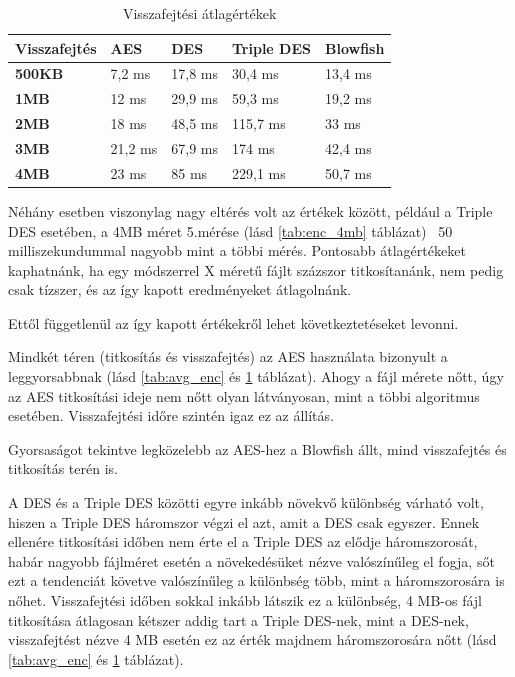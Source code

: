 \begin{table}[H]
	\centering
	\caption{Visszafejtési átlagértékek}
	\label{tab:avg_dec}
	\medskip	
	\begin{tabular}{|p{2.4cm}|p{2.7cm}|p{2.7cm}|p{2.7cm}|p{2.7cm}|}
		\hline
		\textbf{Visszafejtés}& \textbf{AES} & \textbf{DES} & \textbf{Triple DES}  & \textbf{Blowfish} \\
		\hline
		\textbf{500KB}&7,2 ms&17,8 ms&30,4 ms&13,4 ms \\
		\hline
		\textbf{1MB}&12 ms&29,9 ms&59,3 ms&19,2 ms \\
		\hline
		\textbf{2MB}&18 ms&48,5 ms&115,7 ms&33 ms \\
		\hline
		\textbf{3MB}&21,2 ms&67,9 ms&174 ms&42,4 ms \\
		\hline
		\textbf{4MB}&23 ms&85 ms&229,1 ms&50,7 ms \\
		\hline
	\end{tabular}
\end{table}


\noindent Néhány esetben viszonylag nagy eltérés volt az értékek között, például a Triple DES esetében, a 4MB méret 5.mérése (lásd \ref{tab:enc_4mb} táblázat) ~50 milliszekundummal nagyobb mint a többi mérés. Pontosabb átlagértékeket kaphatnánk, ha egy módszerrel X méretű fájlt százszor titkosítanánk, nem pedig csak tízszer, és az így kapott eredményeket átlagolnánk.

Ettől függetlenül az így kapott értékekről lehet következtetéseket levonni.

Mindkét téren (titkosítás és visszafejtés) az AES használata bizonyult a leggyorsabbnak (lásd \ref{tab:avg_enc} és \ref{tab:avg_dec} táblázat). Ahogy a fájl mérete nőtt, úgy az AES titkosítási ideje nem nőtt olyan látványosan, mint a többi algoritmus esetében. Visszafejtési időre szintén igaz ez az állítás. 

Gyorsaságot tekintve legközelebb az AES-hez a Blowfish állt, mind visszafejtés és titkosítás terén is. 

A DES és a Triple DES közötti egyre inkább növekvő különbség várható volt, hiszen a Triple DES háromszor végzi el azt, amit a DES csak egyszer. Ennek ellenére titkosítási időben nem érte el a Triple DES az elődje háromszorosát, habár nagyobb fájlméret esetén a növekedésüket nézve valószínűleg el fogja, sőt ezt a tendenciát követve valószínűleg a különbség több, mint a háromszorosára is nőhet. Visszafejtési időben sokkal inkább látszik ez a különbség, 4 MB-os fájl titkosítása átlagosan kétszer addig tart a Triple DES-nek, mint a DES-nek, visszafejtést nézve 4 MB esetén ez az érték majdnem háromszorosára nőtt (lásd \ref{tab:avg_enc} és \ref{tab:avg_dec} táblázat).

